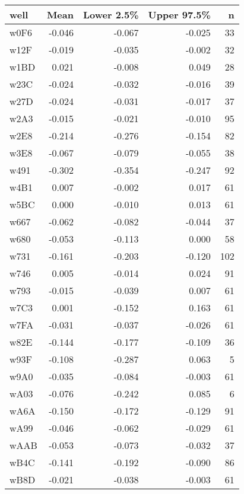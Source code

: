 \begin{table}[ht]
\centering
\begingroup\fontsize{11pt}{11pt}\selectfont
\begin{tabular}{lrrrr}
  \hline
well & Mean & Lower 2.5\% & Upper 97.5\% & n \\ 
  \hline
w0F6 & -0.046 & -0.067 & -0.025 &   33 \\ 
  w12F & -0.019 & -0.035 & -0.002 &   32 \\ 
  w1BD & 0.021 & -0.008 & 0.049 &   28 \\ 
  w23C & -0.024 & -0.032 & -0.016 &   39 \\ 
  w27D & -0.024 & -0.031 & -0.017 &   37 \\ 
  w2A3 & -0.015 & -0.021 & -0.010 &   95 \\ 
  w2E8 & -0.214 & -0.276 & -0.154 &   82 \\ 
  w3E8 & -0.067 & -0.079 & -0.055 &   38 \\ 
  w491 & -0.302 & -0.354 & -0.247 &   92 \\ 
  w4B1 & 0.007 & -0.002 & 0.017 &   61 \\ 
  w5BC & 0.000 & -0.010 & 0.013 &   61 \\ 
  w667 & -0.062 & -0.082 & -0.044 &   37 \\ 
  w680 & -0.053 & -0.113 & 0.000 &   58 \\ 
  w731 & -0.161 & -0.203 & -0.120 &  102 \\ 
  w746 & 0.005 & -0.014 & 0.024 &   91 \\ 
  w793 & -0.015 & -0.039 & 0.007 &   61 \\ 
  w7C3 & 0.001 & -0.152 & 0.163 &   61 \\ 
  w7FA & -0.031 & -0.037 & -0.026 &   61 \\ 
  w82E & -0.144 & -0.177 & -0.109 &   36 \\ 
  w93F & -0.108 & -0.287 & 0.063 &    5 \\ 
  w9A0 & -0.035 & -0.084 & -0.003 &   61 \\ 
  wA03 & -0.076 & -0.242 & 0.085 &    6 \\ 
  wA6A & -0.150 & -0.172 & -0.129 &   91 \\ 
  wA99 & -0.046 & -0.062 & -0.029 &   61 \\ 
  wAAB & -0.053 & -0.073 & -0.032 &   37 \\ 
  wB4C & -0.141 & -0.192 & -0.090 &   86 \\ 
  wB8D & -0.021 & -0.038 & -0.003 &   61 \\ 

\end{tabular}
\end{table}
